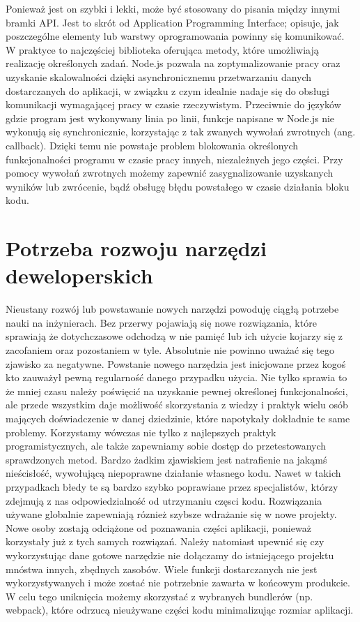 \documentclass[12pt]{report}
\begin{document}
    Ponieważ jest on szybki i lekki, może być stosowany do pisania między innymi bramki API.
    Jest to skrót od Application Programming Interface; opisuje, jak poszczególne elementy lub warstwy oprogramowania powinny się komunikować.
    W praktyce to najczęściej biblioteka oferująca metody, które umożliwiają realizację określonych zadań.
    Node.js pozwala na zoptymalizowanie pracy oraz uzyskanie skalowalności dzięki asynchronicznemu przetwarzaniu danych dostarczanych do aplikacji, w związku z czym idealnie nadaje się do obsługi komunikacji wymagającej pracy w czasie rzeczywistym.
    Przeciwnie do języków gdzie program jest wykonywany linia po linii, funkcje napisane w Node.js nie wykonują się synchronicznie, korzystając z tak zwanych wywołań zwrotnych (ang. callback).
    Dzięki temu nie powstaje problem blokowania określonych funkcjonalności programu w czasie pracy innych, niezależnych jego części.
    Przy pomocy wywołań zwrotnych możemy zapewnić zasygnalizowanie uzyskanych wyników lub zwrócenie, bądź obsługę błędu powstałego w czasie działania bloku kodu.

  \section{Potrzeba rozwoju narzędzi deweloperskich}
    Nieustany rozwój lub powstawanie nowych narzędzi powoduję ciągłą potrzebe nauki na inżynierach.
    Bez przerwy pojawiają się nowe rozwiązania, które sprawiają że dotychczasowe odchodzą w nie pamięć lub ich użycie kojarzy się z zacofaniem oraz pozostaniem w tyle.
    Absolutnie nie powinno uważać się tego zjawisko za negatywne.
    Powstanie nowego narzędzia jest inicjowane przez kogoś kto zauważył pewną regularność danego przypadku użycia.
    Nie tylko sprawia to że mniej czasu należy poświęcić na uzyskanie pewnej określonej funkcjonalności, ale przede wszystkim daje możliwość skorzystania z wiedzy i praktyk wielu osób mających doświadczenie w danej dziedzinie, które napotykały dokładnie te same problemy.
    Korzystamy wówczas nie tylko z najlepszych praktyk programistycznych, ale także zapewniamy sobie dostęp do przetestowanych sprawdzonych metod.
    Bardzo żadkim zjawiskiem jest natrafienie na jakąmś nieścisłość, wywołującą niepoprawne działanie własnego kodu.
    Nawet w takich przypadkach błedy te są bardzo szybko poprawiane przez specjalistów, którzy zdejmują z nas odpowiedzialność od utrzymaniu częsci kodu.
    Rozwiązania używane globalnie zapewniają róznież szybsze wdrażanie się w nowe projekty.
    Nowe osoby zostają odciążone od poznawania części aplikacji, ponieważ korzystały już z tych samych rozwiązań.
    Należy natomiast upewnić się czy wykorzystując dane gotowe narzędzie nie dołączamy do istniejącego projektu mnóstwa innych, zbędnych zasobów.
    Wiele funkcji dostarczanych nie jest wykorzystywanych i może zostać nie potrzebnie zawarta w końcowym produkcie.
    W celu tego uniknięcia możemy skorzystać z wybranych bundlerów (np. webpack), które odrzucą nieużywane części kodu minimalizując rozmiar aplikacji.
\end{document}
